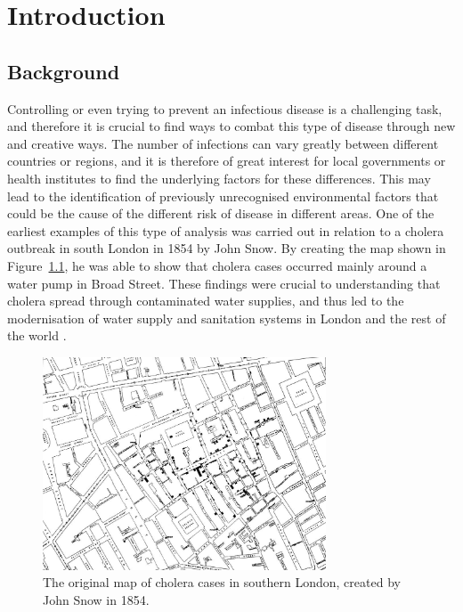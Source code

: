 %
\chapter{Introduction}
\label{sec:intro}
\section{Background}
Controlling or even trying to prevent an infectious disease is a challenging task, and therefore it is crucial to find ways to combat this type of disease through new and creative ways. The number of infections can vary greatly between different countries or regions, and it is therefore of great interest for local governments or health institutes to find the underlying factors for these differences. This may lead to the identification of previously unrecognised environmental factors that could be the cause of the different risk of disease in different areas. One of the earliest examples of this type of analysis was carried out in relation to a cholera outbreak in south London in 1854 by John Snow. By creating the map shown in Figure~\ref{cholera}, he was able to show that cholera cases occurred mainly around a water pump in Broad Street. These findings were crucial to understanding that cholera spread through contaminated water supplies, and thus led to the modernisation of water supply and sanitation systems in London and the rest of the world \autocite[][]{snow1857cholera}.
\begin{figure}[H]
    \centering
    \includegraphics[width = 0.75\textwidth]{cholera_map.jpg}
    \caption{The original map of cholera cases in southern London, created by John Snow in 1854.}
    \label{cholera}
\end{figure}
